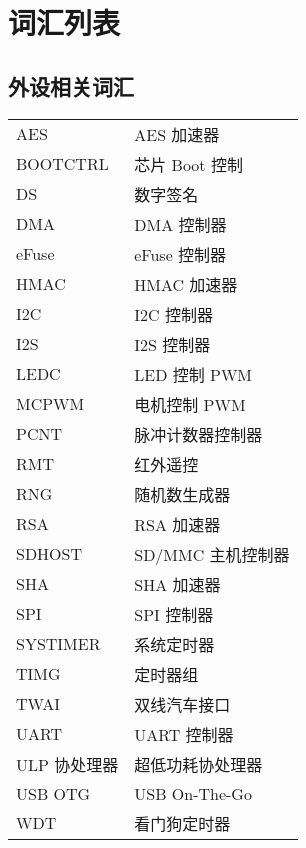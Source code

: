 \chapter*{词汇列表}\label{glossary}

\section*{外设相关词汇}

\begin{longtable}[c]{p{3cm}p{12cm} }

AES & AES 加速器 \\ %
BOOTCTRL & 芯片 Boot 控制 \\ %
DS & 数字签名 \\ %
DMA & DMA 控制器 \\
eFuse & eFuse 控制器 \\
HMAC & HMAC 加速器 \\ %
I2C & I2C 控制器 \\
I2S & I2S 控制器 \\
LEDC & LED 控制 PWM \\
MCPWM & 电机控制 PWM \\
PCNT & 脉冲计数器控制器 \\
RMT & 红外遥控 \\
RNG & 随机数生成器 \\
RSA & RSA 加速器 \\
SDHOST & SD/MMC 主机控制器 \\
SHA & SHA 加速器 \\
SPI & SPI 控制器 \\
SYSTIMER & 系统定时器  \\ %
TIMG & 定时器组 \\
TWAI & 双线汽车接口 \\ %
UART & UART 控制器 \\
ULP 协处理器 & 超低功耗协处理器\\
USB OTG & USB On-The-Go \\ %
WDT & 看门狗定时器 \\ 

\end{longtable}

